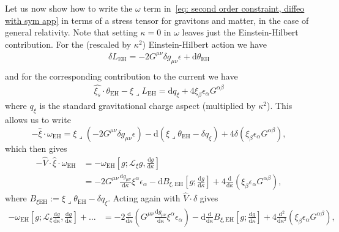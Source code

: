 \documentclass[]{jkpaper}
\theoremstyle{plain}
\theoremstyle{definition}
\newcommand{\sins}{\mathop{\lrcorner}}
\newcommand{\fins}{\cdot}
\newcommand{\sd}{\mathrm {d}}
\newcommand{\fd}{\delta}
\newcommand{\sL}{\mathcal{L}}
\begin{document}
Let us now show how to write the $\omega$ term in~\eqref{eq: second order constraint, diffeo with sym app} in terms of a stress tensor for gravitons and matter, in the case of general relativity. Note that setting $\kappa=0$ in $\omega$ leaves just the Einstein-Hilbert contribution. For the (rescaled by $\kappa^2$) Einstein-Hilbert action we have
\begin{equation}\begin{split}
    \fd L_{\text{EH}} = -2 G^{\mu\nu}\fd g_{\mu\nu}\epsilon+\sd \theta_{\text{EH}}\\
\end{split}\end{equation}
and for the corresponding contribution to the current we have
\begin{equation}\begin{split}
    \hat{\xi_s}\fins\theta_{\text{EH}}-\xi\sins L_{\text{EH}}
    =\sd q_\xi +4\xi_\beta \epsilon_\alpha G^{\alpha\beta}
\end{split}\end{equation}
where $q_\xi$ is the standard gravitational charge aspect (multiplied by $\kappa^2$). This allows us to write
\begin{equation}
    -\hat{\xi}\fins\omega_{\text{EH}}
    =\xi\sins \left(-2G^{\mu\nu}\fd g_{\mu\nu}\epsilon\right)
    -\sd \left(\xi\sins\theta_{\text{EH}}-\fd q_\xi\right)
    +4\fd\left(\xi_\beta\epsilon_\alpha G^{\alpha\beta}\right),
\end{equation}
which then gives
\begin{equation}\begin{split}
    -\hat{V}\fins\hat{\xi}\fins\omega_{\text{EH}}
    &=-\omega_{\text{EH}}\left[g;\sL_\xi g, \frac{\sd g}{\sd\kappa}\right]\\
    &=-2G^{\mu\nu} \frac{\sd g_{\mu\nu}}{\sd\kappa}\xi^\alpha\epsilon_\alpha
    -\sd B_{\xi,\text{EH}}\left[g;\frac{\sd g}{\sd\kappa}\right]
    +4\frac{\sd}{\sd\kappa}\left(\xi_\beta\epsilon_\alpha G^{\alpha\beta}\right),
\end{split}\end{equation}
where $B_{\xi\text{EH}}:=\xi\sins\theta_{\text{EH}}-\fd q_\xi$.  Acting again with $\hat{V}\fins \fd$ gives
\begin{equation}\begin{split}
    -\omega_{\text{EH}}\left[g;\sL_\xi \frac{\sd g}{\sd\kappa}, \frac{\sd g}{\sd\kappa}\right]+\dots
    &=-2\frac{\sd}{\sd\kappa}\left(G^{\mu\nu} \frac{\sd g_{\mu\nu}}{\sd\kappa}\xi^\alpha\epsilon_\alpha\right)
    -\sd \frac{\sd}{\sd\kappa}B_{\xi,\text{EH}}\left[g;\frac{\sd g}{\sd\kappa}\right]
    +4\frac{\sd^2}{\sd\kappa^2}\left(\xi_\beta\epsilon_\alpha G^{\alpha\beta}\right),
\end{split}\end{equation}
\end{document}
